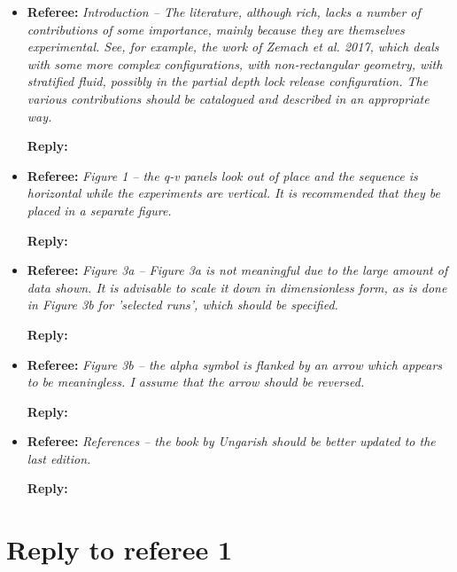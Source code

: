\documentclass[12pt]{article}
\newcommand{\MinorReply}[3]{\filbreak\noindent
\textbf{Referee:}
\emph{#1 -- #2}

\textbf{Reply:} {\color{blue}{#3}}
}
\begin{document}
\begin{itemize}
    \item \MinorReply{Introduction}{The literature, although rich, lacks a number of contributions of some importance, mainly because they are themselves experimental. See, for example, the work of Zemach et al. 2017, which deals with some more complex configurations, with non-rectangular geometry, with stratified fluid, possibly in the partial depth lock release configuration. The various contributions should be catalogued and described in an appropriate way.}{The introduction has been rewritten according to various comments of the referees and other readers. Some references have been added. Note that we can not provide an extensive catalog of the complete literature related to gravity currents in such an introduction, bound to have a manuscript of reasonable length. We have then focused on the literature that shares the most scientific objectives with the present contribution.}

    \item \MinorReply{Figure 1}{the q-v panels look out of place and the sequence is horizontal while the experiments are vertical. It is recommended that they be placed in a separate figure.}{There are already many figures compared to the text length, and we do not wish to emphasize the numerical simulations by adding a dedicated figure. Hence, we modified figure 1 to better separate the q-v panels from the rest.}

    \item \MinorReply{Figure 3a}{Figure 3a is not meaningful due to the large amount of data shown. It is advisable to scale it down in dimensionless form, as is done in Figure 3b for 'selected runs', which should be specified.}{Done.}

    \item \MinorReply{Figure 3b}{the alpha symbol is flanked by an arrow which appears to be meaningless. I assume that the arrow should be reversed.}{The flanking arrows have been removed, and the figure caption has been modified accordingly.}

    \item \MinorReply{References}{the book by Ungarish should be better updated to the last edition.}{Done.}
\end{itemize}


\newpage
\section{Reply to referee 1}
\end{document}
